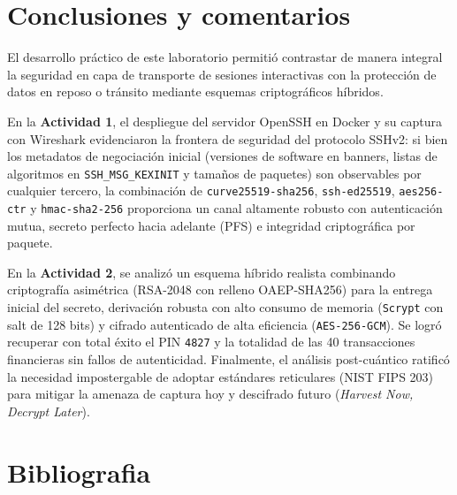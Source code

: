 \documentclass[letter,12pt]{article}
\begin{document}
\clearpage
\section*{Conclusiones y comentarios}

El desarrollo práctico de este laboratorio permitió contrastar de manera integral la seguridad en capa de transporte de sesiones interactivas con la protección de datos en reposo o tránsito mediante esquemas criptográficos híbridos.

En la \textbf{Actividad 1}, el despliegue del servidor OpenSSH en Docker y su captura con Wireshark evidenciaron la frontera de seguridad del protocolo SSHv2: si bien los metadatos de negociación inicial (versiones de software en banners, listas de algoritmos en \texttt{SSH\_MSG\_KEXINIT} y tamaños de paquetes) son observables por cualquier tercero, la combinación de \texttt{curve25519-sha256}, \texttt{ssh-ed25519}, \texttt{aes256-ctr} y \texttt{hmac-sha2-256} proporciona un canal altamente robusto con autenticación mutua, secreto perfecto hacia adelante (PFS) e integridad criptográfica por paquete.

En la \textbf{Actividad 2}, se analizó un esquema híbrido realista combinando criptografía asimétrica (RSA-2048 con relleno OAEP-SHA256) para la entrega inicial del secreto, derivación robusta con alto consumo de memoria (\texttt{Scrypt} con salt de 128 bits) y cifrado autenticado de alta eficiencia (\texttt{AES-256-GCM}). Se logró recuperar con total éxito el PIN \texttt{4827} y la totalidad de las 40 transacciones financieras sin fallos de autenticidad. Finalmente, el análisis post-cuántico ratificó la necesidad impostergable de adoptar estándares reticulares (NIST FIPS 203) para mitigar la amenaza de captura hoy y descifrado futuro (\textit{Harvest Now, Decrypt Later}).

\clearpage
\section{Bibliografia}
\end{document}
